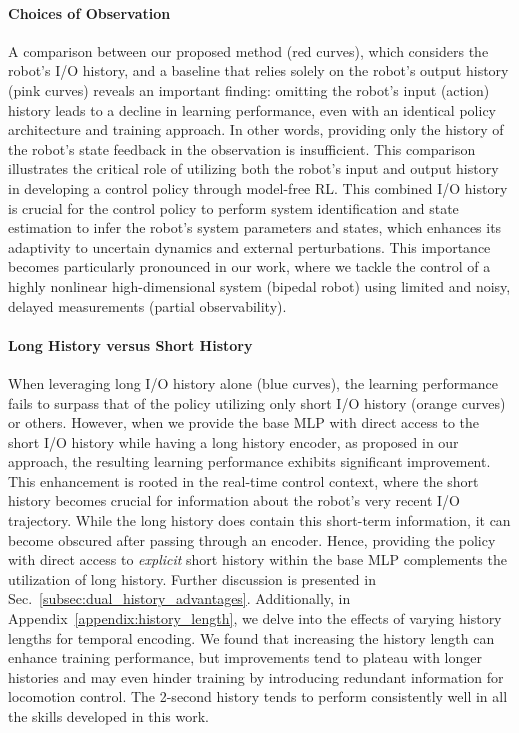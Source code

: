 \paragraph{Choices of Observation}
A comparison between our proposed method (red curves), which considers the robot's I/O history, and a baseline that relies solely on the robot's output history (pink curves) reveals an important finding: omitting the robot's input (action) history leads to a decline in learning performance, even with an identical policy architecture and training approach. 
In other words, providing only the history of the robot's state feedback in the observation is insufficient.
This comparison illustrates the critical role of utilizing both the robot's input and output history in developing a control policy through model-free RL.
This combined I/O history is crucial for the control policy to perform system identification and state estimation to infer the robot's system parameters and states, which enhances its adaptivity to uncertain dynamics and external perturbations.
This importance becomes particularly pronounced in our work, where we tackle the control of a highly nonlinear high-dimensional system (bipedal robot) using limited and noisy, delayed measurements (partial observability).


\paragraph{Long History versus Short History}
When leveraging long I/O history alone (blue curves), the learning performance fails to surpass that of the policy utilizing only short I/O history (orange curves) or others.
However, when we provide the base MLP with direct access to the short I/O history while having a long history encoder, as proposed in our approach, the resulting learning performance exhibits significant improvement. 
This enhancement is rooted in the real-time control context, where the short history becomes crucial for information about the robot's very recent I/O trajectory. 
While the long history does contain this short-term information, it can become obscured after passing through an encoder. Hence, providing the policy with direct access to \emph{explicit} short history within the base MLP complements the utilization of long history. Further discussion is presented in Sec.~\ref{subsec:dual_history_advantages}.
Additionally, in Appendix~\ref{appendix:history_length}, we delve into the effects of varying history lengths for temporal encoding. We found that increasing the history length can enhance training performance, but improvements tend to plateau with longer histories and may even hinder training by introducing redundant information for locomotion control. The 2-second history tends to perform consistently well in all the skills developed in this work.


